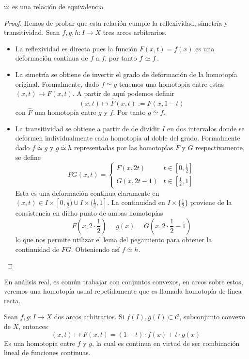 \begin{teorema}
  \(\stackrel{.}{\simeq}\) es una relación de equivalencia
\end{teorema}
\begin{proof}
  Hemos de probar que esta relación cumple la reflexividad, simetría y
  transitividad. Sean \(f,g,h : I \to X\) tres arcos arbitrarios.
  \begin{itemize}
  \item La reflexividad es directa pues la función \(F(x,t) = f(x)\) es
    una deformación continua de \(f\) a \(f\), por tanto \(f \stackrel{.}{\simeq}
    f\).

  \item La simetría se obtiene de invertir el grado de deformación de la
    homotopía original. Formalmente, dado \(f \stackrel{.}{\simeq} g\)
    tenemos una homotopía entre estas \((x,t) \mapsto F(x,t)\). A partir
    de aquí podemos definir
    \begin{equation}
      \label{eq:homotopy-simetry}
      (x,t) \mapsto \hat{F}(x,t) := F(x,1-t)
    \end{equation}
    con \(\hat{F}\) una homotopía entre \(g\) y \(f\). Por tanto \(g
    \stackrel{.}{\simeq} f\).


  \item La transitividad se obtiene a partir de de dividir \(I\) en dos
    intervalos donde se deformen individualmente cada homotopía al doble
    del grado. Formalmente dado \(f \stackrel{.}{\simeq} g\) y \(g
    \stackrel{.}{\simeq} h\) representadas por las homotopías \(F\) y
    \(G\) respectivamente, se define
    \[ FG(x,t) = \begin{cases}
        F(x,2t) & t \in [0,\frac{1}{2}] \\
        G(x,2t - 1) & t \in [ \frac{1}{2} , 1]
      \end{cases}
    \]
    Esta es una deformación continua claramente en \((x,t) \in I \times
    [0, \frac{1}{2}) \cup I \times (\frac{1}{2}, 1]\). La continuidad en
    \(I \times \{\frac{1}{2}\}\) proviene de la consistencia en dicho
    punto de ambas homotopías
    \[ F(x,2 \cdot \frac{1}{2}) = g(x) = G(x, 2 \cdot \frac{1}{2} - 1)\]
    lo que nos permite utilizar el lema del pegamiento para obtener la
    continuidad de \(FG\). Obteniendo así \(f \stackrel{.}{\simeq} h\).
  \end{itemize}
\end{proof}

En análisis real, es común trabajar con conjuntos convexos, en arcos
sobre estos, veremos una homotopía usual repetidamente que es llamada
homotopía de linea recta.
\begin{definicion}\label{def:homotopia-linea}
  Sean \(f,g : I \to X\) dos arcos arbitrarios. Si \(f(I),g(I) \subset
  \mathcal C\), subconjunto convexo de \(X\), entonces
  \[ (x,t) \mapsto F(x,t) = (1-t) \cdot f(x) + t \cdot g(x) \]
  Es una homotopía entre \(f\) y \(g\), la cual es continua en virtud de
  ser combinación lineal de funciones continuas.
\end{definicion}

